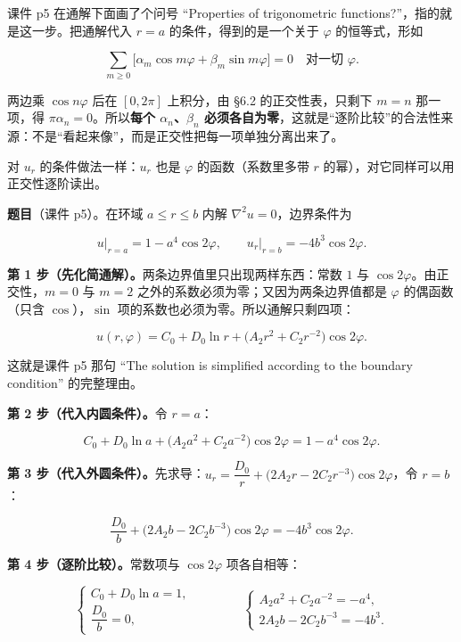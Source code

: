\documentclass[11pt]{ctexart}
\let\origsubhdr\subhdr
\renewcommand{\subhdr}[1]{\par\needspace{3\baselineskip}\origsubhdr{#1}}
\begin{document}
课件 p5 在通解下面画了个问号 “Properties of trigonometric functions?”，指的就是这一步。把通解代入 $r=a$ 的条件，得到的是一个关于 $\varphi$ 的恒等式，形如

\[
\sum_{m\ge0}\big[\alpha_m\cos m\varphi+\beta_m\sin m\varphi\big]=0\quad\text{对一切 }\varphi .
\]

两边乘 $\cos n\varphi$ 后在 $[0,2\pi]$ 上积分，由 \S6.2 的正交性表，只剩下 $m=n$ 那一项，得 $\pi\alpha_n=0$。所以\textbf{每个 $\alpha_n$、$\beta_n$ 必须各自为零}，这就是“逐阶比较”的合法性来源：不是“看起来像”，而是正交性把每一项单独分离出来了。

对 $u_r$ 的条件做法一样：$u_r$ 也是 $\varphi$ 的函数（系数里多带 $r$ 的幂），对它同样可以用正交性逐阶读出。


\textbf{题目}（课件 p5）。在环域 $a\le r\le b$ 内解 $\nabla^2u=0$，边界条件为

\[
u\big|_{r=a}=1-a^4\cos2\varphi,\qquad
u_r\big|_{r=b}=-4b^3\cos2\varphi .
\]

\textbf{第 1 步（先化简通解）。}两条边界值里只出现两样东西：常数 $1$ 与 $\cos2\varphi$。由正交性，$m=0$ 与 $m=2$ 之外的系数必须为零；又因为两条边界值都是 $\varphi$ 的偶函数（只含 $\cos$），$\sin$ 项的系数也必须为零。所以通解只剩四项：

\begin{equation}
u(r,\varphi)=C_0+D_0\ln r+\big(A_2r^2+C_2r^{-2}\big)\cos2\varphi .
\label{eq:annform}
\end{equation}

这就是课件 p5 那句 “The solution is simplified according to the boundary condition” 的完整理由。

\textbf{第 2 步（代入内圆条件）。}令 $r=a$：

\[
C_0+D_0\ln a+\big(A_2a^2+C_2a^{-2}\big)\cos2\varphi=1-a^4\cos2\varphi .
\]

\textbf{第 3 步（代入外圆条件）。}先求导：$u_r=\dfrac{D_0}{r}+\big(2A_2r-2C_2r^{-3}\big)\cos2\varphi$，令 $r=b$：

\[
\frac{D_0}{b}+\big(2A_2b-2C_2b^{-3}\big)\cos2\varphi=-4b^3\cos2\varphi .
\]

\textbf{第 4 步（逐阶比较）。}常数项与 $\cos2\varphi$ 项各自相等：

\begin{equation}
\begin{cases}
C_0+D_0\ln a=1,\\[2pt]
\dfrac{D_0}{b}=0,
\end{cases}
\qquad\qquad
\begin{cases}
A_2a^2+C_2a^{-2}=-a^4,\\[2pt]
2A_2b-2C_2b^{-3}=-4b^3 .
\end{cases}
\label{eq:annsys}
\end{equation}
\end{document}
